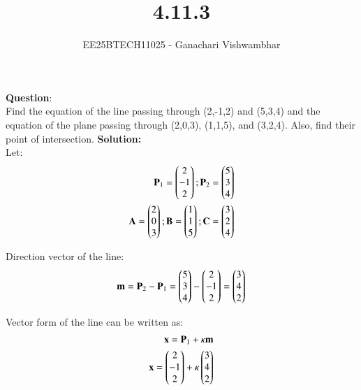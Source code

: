 \documentclass[journal]{IEEEtran}
\begin{document}
\title{4.11.3}
\author{EE25BTECH11025 - Ganachari Vishwambhar}
\maketitle

\textbf{Question}:\\
Find the equation of the line passing through (2,-1,2) and (5,3,4) and the equation of the plane passing through (2,0,3), (1,1,5), and (3,2,4). Also, find their point of intersection.
\textbf{Solution: }\\

Let:
\begin{align}
    \mathbf{P}_1=\begin{pmatrix}2\\-1\\2\end{pmatrix};
    \mathbf{P}_2=\begin{pmatrix}5\\3\\4\end{pmatrix}\\
    \mathbf{A}=\begin{pmatrix}2\\0\\3\end{pmatrix};\mathbf{B}=\begin{pmatrix}1\\1\\5\end{pmatrix};\mathbf{C}=\begin{pmatrix}3\\2\\4\end{pmatrix}    
\end{align}

Direction vector of the line:
\begin{align}
    \mathbf{m}=\mathbf{P}_2-\mathbf{P}_1=\begin{pmatrix}5\\3\\4\end{pmatrix}-\begin{pmatrix}2\\-1\\2\end{pmatrix}=\begin{pmatrix}3\\4\\2\end{pmatrix}
\end{align}

Vector form of the line can be written as:
\begin{align}
    \mathbf{x}=\mathbf{P}_1+\kappa\mathbf{m}\\
    \mathbf{x}=\begin{pmatrix}2\\-1\\2\end{pmatrix}+\kappa\begin{pmatrix}3\\4\\2\end{pmatrix}
\end{align}
\end{document}
